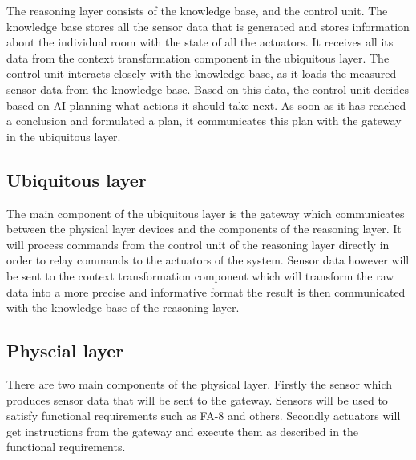 The reasoning layer consists of the knowledge base, and the control unit.
The knowledge base stores all the sensor data that is generated and stores information about the individual room with the state of all the actuators.
It receives all its data from the context transformation component in the ubiquitous layer.
The control unit interacts closely with the knowledge base, as it loads the measured sensor data from the knowledge base.
Based on this data, the control unit decides based on AI-planning what actions it should take next.
As soon as it has reached a conclusion and formulated a plan, it communicates this plan with the gateway in the ubiquitous layer.

\subsection{Ubiquitous layer}\label{subsec:ubiquitous-layer}

The main component of the ubiquitous layer is the gateway which communicates between the physical layer devices and the components of the reasoning layer.
It will process commands from the control unit of the reasoning layer directly in order to relay commands to the actuators of the system.
Sensor data however will be sent to the context transformation component which will transform the raw data into a more precise and informative format the result is then communicated with the knowledge base of the reasoning layer.

\subsection{Physcial layer}\label{subsec:physcial-layer}

There are two main components of the physical layer.
Firstly the sensor which produces sensor data that will be sent to the gateway.
Sensors will be used to satisfy functional requirements such as FA-8 and others.
Secondly actuators will get instructions from the gateway and execute them as described in the functional requirements.
